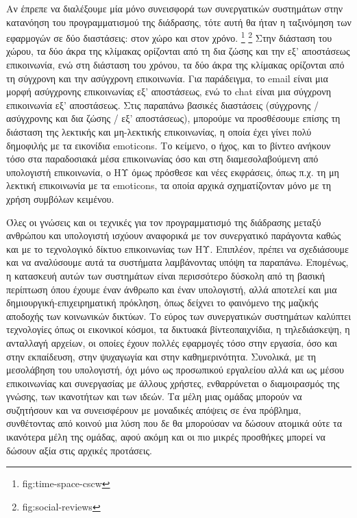 \documentclass[
]{article}
\begin{document}
Αν έπρεπε να διαλέξουμε μία μόνο συνεισφορά των συνεργατικών συστημάτων
στην κατανόηση του προγραμματισμού της διάδρασης, τότε αυτή θα ήταν η
ταξινόμηση των εφαρμογών σε δύο διαστάσεις: στον χώρο και στον χρόνο.
\footnote{fig:time-space-cscw} \footnote{fig:social-reviews} Στην
διάσταση του χώρου, τα δύο άκρα της κλίμακας ορίζονται από τη δια ζώσης
και την εξ' αποστάσεως επικοινωνία, ενώ στη διάσταση του χρόνου, τα δύο
άκρα της κλίμακας ορίζονται από τη σύγχρονη και την ασύγχρονη
επικοινωνία. Για παράδειγμα, το email είναι μια μορφή ασύγχρονης
επικοινωνίας εξ' αποστάσεως, ενώ το chat είναι μια σύγχρονη επικοινωνία
εξ' αποστάσεως. Στις παραπάνω βασικές διαστάσεις (σύγχρονης / ασύγχρονης
και δια ζώσης / εξ' αποστάσεως), μπορούμε να προσθέσουμε επίσης τη
διάσταση της λεκτικής και μη-λεκτικής επικοινωνίας, η οποία έχει γίνει
πολύ δημοφιλής με τα εικονίδια emoticons. Το κείμενο, ο ήχος, και το
βίντεο ανήκουν τόσο στα παραδοσιακά μέσα επικοινωνίας όσο και στη
διαμεσολαβούμενη από υπολογιστή επικοινωνία, ο ΗΥ όμως πρόσθεσε και νέες
εκφράσεις, όπως π.χ. τη μη λεκτική επικοινωνία με τα emoticons, τα οποία
αρχικά σχηματίζονταν μόνο με τη χρήση συμβόλων κειμένου.

Όλες οι γνώσεις και οι τεχνικές για τον προγραμματισμό της διάδρασης
μεταξύ ανθρώπου και υπολογιστή ισχύουν αναφορικά με τον συνεργατικό
παράγοντα καθώς και με το τεχνολογικό δίκτυο επικοινωνίας των ΗΥ.
Επιπλέον, πρέπει να σχεδιάσουμε και να αναλύσουμε αυτά τα συστήματα
λαμβάνοντας υπόψη τα παραπάνω. Επομένως, η κατασκευή αυτών των
συστημάτων είναι περισσότερο δύσκολη από τη βασική περίπτωση όπου έχουμε
έναν άνθρωπο και έναν υπολογιστή, αλλά αποτελεί και μια
δημιουργική-επιχειρηματική πρόκληση, όπως δείχνει το φαινόμενο της
μαζικής αποδοχής των κοινωνικών δικτύων. Το εύρος των συνεργατικών
συστημάτων καλύπτει τεχνολογίες όπως οι εικονικοί κόσμοι, τα δικτυακά
βίντεοπαιχνίδια, η τηλεδιάσκεψη, η ανταλλαγή αρχείων, οι οποίες έχουν
πολλές εφαρμογές τόσο στην εργασία, όσο και στην εκπαίδευση, στην
ψυχαγωγία και στην καθημερινότητα. Συνολικά, με τη μεσολάβηση του
υπολογιστή, όχι μόνο ως προσωπικού εργαλείου αλλά και ως μέσου
επικοινωνίας και συνεργασίας με άλλους χρήστες, ενθαρρύνεται ο
διαμοιρασμός της γνώσης, των ικανοτήτων και των ιδεών. Τα μέλη μιας
ομάδας μπορούν να συζητήσουν και να συνεισφέρουν με μοναδικές απόψεις σε
ένα πρόβλημα, συνθέτοντας από κοινού μια λύση που δε θα μπορούσαν να
δώσουν ατομικά ούτε τα ικανότερα μέλη της ομάδας, αφού ακόμη και οι πιο
μικρές προσθήκες μπορεί να δώσουν αξία στις αρχικές προτάσεις.
\end{document}

